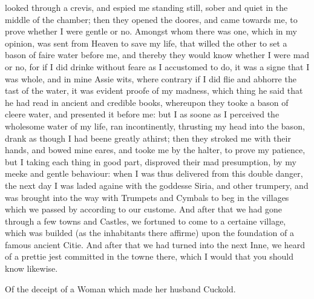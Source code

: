 looked through a crevis, and espied me standing still, sober and quiet in the
middle of the chamber; then they opened the doores, and came towards me, to
prove whether I were gentle or no. Amongst whom there was one, which in my
opinion, was sent from Heaven to save my life, that willed the other to set a
bason of faire water before me, and thereby they would know whether I were mad
or no, for if I did drinke without feare as I accustomed to do, it was a signe
that I was whole, and in mine Assie wits, where contrary if I did flie and
abhorre the tast of the water, it was evident proofe of my madness, which thing
he said that he had read in ancient and credible books, whereupon they tooke a
bason of cleere water, and presented it before me: but I as soone as I
perceived the wholesome water of my life, ran incontinently, thrusting my head
into the bason, drank as though I had beene greatly athirst; then they stroked
me with their hands, and bowed mine eares, and tooke me by the halter, to prove
my patience, but I taking each thing in good part, disproved their mad
presumption, by my meeke and gentle behaviour: when I was thus delivered from
this double danger, the next day I was laded againe with the goddesse Siria,
and other trumpery, and was brought into the way with Trumpets and Cymbals to
beg in the villages which we passed by according to our custome. And after that
we had gone through a few towns and Castles, we fortuned to come to a certaine
village, which was builded (as the inhabitants there affirme) upon the
foundation of a famous ancient Citie. And after that we had turned into the
next Inne, we heard of a prettie jest committed in the towne there, which I
would that you should know likewise.


Of the deceipt of a Woman which made her husband Cuckold.

